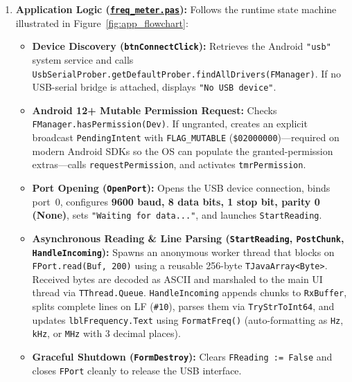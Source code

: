 \documentclass[11pt,a4paper]{article}
\newcommand{\githubrepo}{https://github.com/m7mdelsayegh/frequency_meter}
\newcommand{\ghblob}[2]{\href{\githubrepo/blob/main/#1}{\texttt{#2}}}
\begin{document}
\begin{enumerate}[leftmargin=1.5em]
    \item \textbf{Application Logic (\ghblob{3_Delphi_Android_App/freq_meter.pas}{freq\_meter.pas}):}
    Follows the runtime state machine illustrated in Figure~\ref{fig:app_flowchart}:
    \begin{itemize}
        \item \textbf{Device Discovery (\texttt{btnConnectClick}):} Retrieves the Android \texttt{"usb"} system service and calls \texttt{UsbSerialProber.getDefaultProber.findAllDrivers(FManager)}. If no USB-serial bridge is attached, displays \texttt{"No USB device"}.
        \item \textbf{Android 12+ Mutable Permission Request:} Checks \texttt{FManager.hasPermission(Dev)}. If ungranted, creates an explicit broadcast \texttt{PendingIntent} with \texttt{FLAG\_MUTABLE} (\texttt{\$02000000})---required on modern Android SDKs so the OS can populate the granted-permission extras---calls \texttt{requestPermission}, and activates \texttt{tmrPermission}.
        \item \textbf{Port Opening (\texttt{OpenPort}):} Opens the USB device connection, binds port~0, configures \textbf{9600 baud, 8 data bits, 1 stop bit, parity 0 (None)}, sets \texttt{"Waiting for data..."}, and launches \texttt{StartReading}.
        \item \textbf{Asynchronous Reading \& Line Parsing (\texttt{StartReading}, \texttt{PostChunk}, \texttt{HandleIncoming}):} Spawns an anonymous worker thread that blocks on \texttt{FPort.read(Buf, 200)} using a reusable 256-byte \texttt{TJavaArray<Byte>}. Received bytes are decoded as ASCII and marshaled to the main UI thread via \texttt{TThread.Queue}. \texttt{HandleIncoming} appends chunks to \texttt{RxBuffer}, splits complete lines on LF (\texttt{\#10}), parses them via \texttt{TryStrToInt64}, and updates \texttt{lblFrequency.Text} using \texttt{FormatFreq()} (auto-formatting as \texttt{Hz}, \texttt{kHz}, or \texttt{MHz} with 3 decimal places).
        \item \textbf{Graceful Shutdown (\texttt{FormDestroy}):} Clears \texttt{FReading := False} and closes \texttt{FPort} cleanly to release the USB interface.
    \end{itemize}
\end{enumerate}
\end{document}
